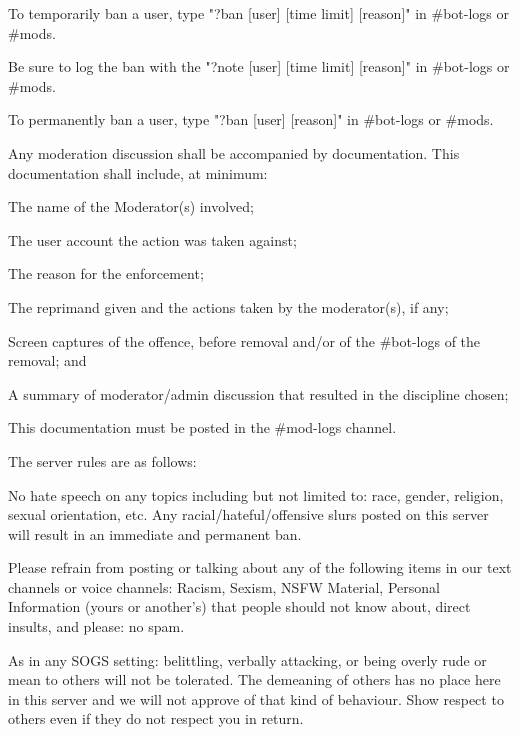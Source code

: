 \begin{longenum}[ label*=\thesubsection.\arabic*., align=left]
\begin{longenum}[label*=\arabic*., align=left]
\begin{longenum}[label*=\arabic*., align=left]
\begin{longenum}[label*=\arabic*., align=left]
				\end{longenum}	
			\item To temporarily ban a user, type "?ban [user] [time limit] [reason]" in \#bot-logs or \#mods.
				\begin{longenum}[label*=\arabic*., align=left]
				\item Be sure to log the ban with the "?note [user] [time limit] [reason]" in \#bot-logs or \#mods.
				\end{longenum}	
			\item To permanently ban a user, type "?ban [user] [reason]" in \#bot-logs or \#mods.
			\end{longenum}	
		\item Any moderation discussion shall be accompanied by documentation. This documentation shall include, at minimum:
			\begin{longenum}[label*=\arabic*., align=left]
			\item The name of the Moderator(s) involved;
			\item The user account the action was taken against;
			\item The reason for the enforcement;
			\item The reprimand given and the actions taken by the moderator(s), if any;
			\item Screen captures of the offence, before removal and/or of the \#bot-logs of the removal; and
			\item A summary of moderator/admin discussion that resulted in the discipline chosen;
			\item This documentation must be posted in the \#mod-logs channel.
			\end{longenum}	
		\end{longenum}	
	\item The server rules are as follows:
		\begin{longenum}[label*=\arabic*., align=left]	
			\item No hate speech on any topics including but not limited to: race, gender, religion, sexual orientation, etc. Any racial/hateful/offensive slurs posted on this server will result in an immediate and permanent ban.
			\item Please refrain from posting or talking about any of the following items in our text channels or voice channels: Racism, Sexism, NSFW Material, Personal Information (yours or another's) that people should not know about, direct insults, and please: no spam.
			\item As in any SOGS setting: belittling, verbally attacking, or being overly rude or mean to others will not be tolerated. The demeaning of others has no place here in this server and we will not approve of that kind of behaviour. Show respect to others even if they do not respect you in return.

\end{longenum}
\end{longenum}
